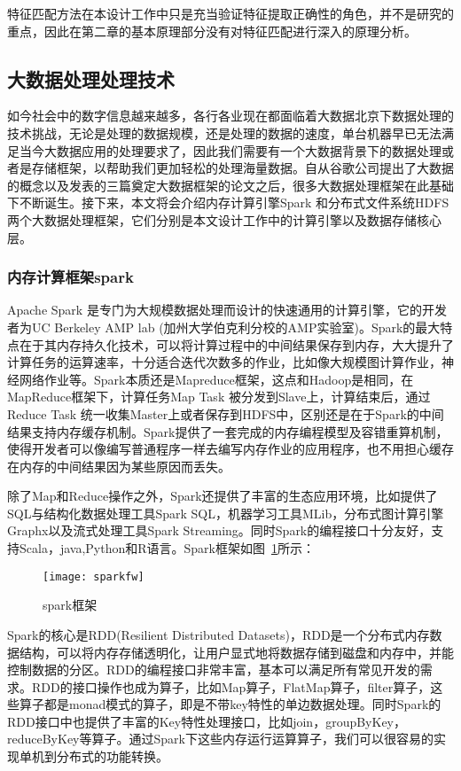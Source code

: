 特征匹配方法在本设计工作中只是充当验证特征提取正确性的角色，并不是研究的重点，因此在第二章的基本原理部分没有对特征匹配进行深入的原理分析。

\subsection{大数据处理处理技术}
如今社会中的数字信息越来越多，各行各业现在都面临着大数据北京下数据处理的技术挑战，无论是处理的数据规模，还是处理的数据的速度，单台机器早已无法满足当今大数据应用的处理要求了，因此我们需要有一个大数据背景下的数据处理或者是存储框架，以帮助我们更加轻松的处理海量数据。自从谷歌公司提出了大数据的概念以及发表的三篇奠定大数据框架的论文之后，很多大数据处理框架在此基础下不断诞生。接下来，本文将会介绍内存计算引擎Spark 和分布式文件系统HDFS 两个大数据处理框架，它们分别是本文设计工作中的计算引擎以及数据存储核心层。
\subsubsection{内存计算框架spark}
Apache Spark 是专门为大规模数据处理而设计的快速通用的计算引擎，它的开发者为UC Berkeley AMP lab (加州大学伯克利分校的AMP实验室)。Spark的最大特点在于其内存持久化技术，可以将计算过程中的中间结果保存到内存，大大提升了计算任务的运算速率，十分适合迭代次数多的作业，比如像大规模图计算作业，神经网络作业等。Spark本质还是Mapreduce框架，这点和Hadoop是相同，在MapReduce框架下，计算任务Map Task 被分发到Slave上，计算结束后，通过Reduce Task 统一收集Master上或者保存到HDFS中，区别还是在于Spark的中间结果支持内存缓存机制。Spark提供了一套完成的内存编程模型及容错重算机制，使得开发者可以像编写普通程序一样去编写内存作业的应用程序，也不用担心缓存在内存的中间结果因为某些原因而丢失。

除了Map和Reduce操作之外，Spark还提供了丰富的生态应用环境，比如提供了SQL与结构化数据处理工具Spark SQL，机器学习工具MLib，分布式图计算引擎Graphx以及流式处理工具Spark Streaming。同时Spark的编程接口十分友好，支持Scala，java,Python和R语言。Spark框架如图~\ref{fig:sparkfw}所示：
\begin{figure}[htp]
\centering
\texttt{[image: sparkfw]}
\caption{spark框架}
\label{fig:sparkfw}
\end{figure}

Spark的核心是RDD(Resilient Distributed Datasets)，RDD是一个分布式内存数据结构，可以将内存存储透明化，让用户显式地将数据存储到磁盘和内存中，并能控制数据的分区。RDD的编程接口非常丰富，基本可以满足所有常见开发的需求。RDD的接口操作也成为算子，比如Map算子，FlatMap算子，filter算子，这些算子都是monad模式的算子，即是不带key特性的单边数据处理。同时Spark的RDD接口中也提供了丰富的Key特性处理接口，比如join，groupByKey，reduceByKey等算子。通过Spark下这些内存运行运算算子，我们可以很容易的实现单机到分布式的功能转换。

